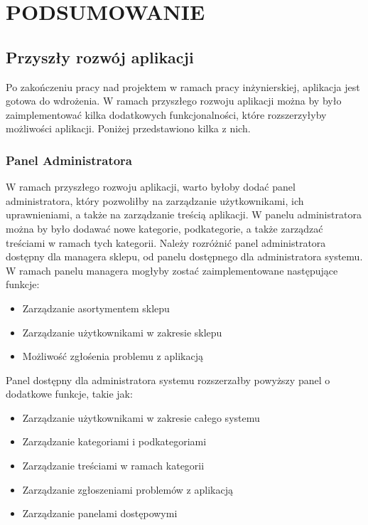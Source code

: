 \chapter{PODSUMOWANIE}
\label{chapter:podsumowanie}

\section{Przyszły rozwój aplikacji}

Po zakończeniu pracy nad projektem w ramach pracy inżynierskiej, aplikacja jest gotowa do wdrożenia. W ramach przyszłego rozwoju aplikacji można by było zaimplementować kilka dodatkowych funkcjonalności, które rozszerzyłyby możliwości aplikacji. Poniżej przedstawiono kilka z nich.

\subsection{Panel Administratora}
W ramach przyszłego rozwoju aplikacji, warto byłoby dodać panel administratora, który pozwoliłby na zarządzanie użytkownikami, ich uprawnieniami, a także na zarządzanie treścią aplikacji. W panelu administratora można by było dodawać nowe kategorie, podkategorie, a także zarządzać treściami w ramach tych kategorii.
Należy rozróżnić panel administratora dostępny dla managera sklepu, od panelu dostępnego dla administratora systemu. W ramach panelu managera mogłyby zostać zaimplementowane następujące funkcje:
\begin{itemize}
    \item Zarządzanie asortymentem sklepu
    \item Zarządzanie użytkownikami w zakresie sklepu
    \item Możliwość zgłośenia problemu z aplikacją
\end{itemize}

Panel dostępny dla administratora systemu rozszerzałby powyższy panel o dodatkowe funkcje, takie jak:
\begin{itemize}
    \item Zarządzanie użytkownikami w zakresie całego systemu
    \item Zarządzanie kategoriami i podkategoriami
    \item Zarządzanie treściami w ramach kategorii
    \item Zarządzanie zgłoszeniami problemów z aplikacją
    \item Zarządzanie panelami dostępowymi
\end{itemize}

